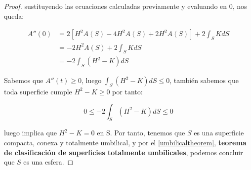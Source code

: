 \begin{proof}
sustituyendo las ecuaciones calculadas previamente y evaluando en $0$, nos queda:

\begin{align*}
    A''(0) &= 2\left[ H^2A(S) -4H^2A(S) + 2H^2A(S) \right] + 2\int_S KdS \\
    &= -2H^2A(S) + 2\int_S KdS \\
    &= -2\int_S (H^2-K) dS
\end{align*}

Sabemos que $A''(t) \geq 0$, luego $\int_S (H^2-K) dS \leq 0$, también sabemos que toda superficie cumple $H^2-K \geq 0$ por tanto:

\begin{equation*}
    0 \leq -2\int_S (H^2-K) dS \leq 0
\end{equation*}

luego implica que $H^2-K = 0$ en S. Por tanto, tenemos que $S$ es una superficie compacta, conexa y totalmente umbilical, y por el \autoref{umbilicaltheorem}, \textbf{teorema de clasificación de superficies totalmente umbilicales}, podemos concluir que $S$ es una esfera.

\end{proof}